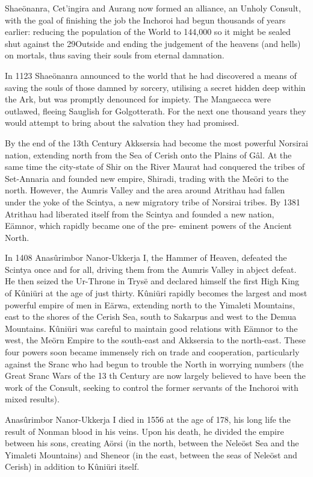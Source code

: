 \documentclass[]{book}
\begin{document}
Shaeönanra, Cet'ingira and Aurang now formed an alliance, an Unholy Consult, with
the goal of finishing the job the Inchoroi had begun thousands of years earlier:
reducing the population of the World to 144,000 so it might be sealed shut against the
29Outside and ending the judgement of the heavens (and hells) on mortals, thus saving
their souls from eternal damnation.

In 1123 Shaeönanra announced to the world that he had discovered a means of saving
the souls of those damned by sorcery, utilising a secret hidden deep within the Ark, but
was promptly denounced for impiety. The Mangaecca were outlawed, fleeing Sauglish
for Golgotterath. For the next one thousand years they would attempt to bring about
the salvation they had promised.

By the end of the 13th Century Akksersia had become the most powerful Norsirai
nation, extending north from the Sea of Cerish onto the Plains of Gâl. At the same
time the city-state of Shir on the River Maurat had conquered the tribes of Set-Annaria
and founded new empire, Shiradi, trading with the Meöri to the north. However, the
Aumris Valley and the area around Atrithau had fallen under the yoke of the Scintya, a
new migratory tribe of Norsirai tribes. By 1381 Atrithau had liberated itself from the
Scintya and founded a new nation, Eämnor, which rapidly became one of the pre-
eminent powers of the Ancient North.

In 1408 Anasûrimbor Nanor-Ukkerja I, the Hammer of Heaven, defeated the Scintya
once and for all, driving them from the Aumris Valley in abject defeat. He then seized
the Ur-Throne in Trysë and declared himself the first High King of Kûniüri at the age
of just thirty. Kûniüri rapidly becomes the largest and most powerful empire of men in
Eärwa, extending north to the Yimaleti Mountains, east to the shores of the Cerish Sea,
south to Sakarpus and west to the Demua Mountains. Kûniüri was careful to maintain
good relations with Eämnor to the west, the Meörn Empire to the south-east and
Akksersia to the north-east. These four powers soon became immensely rich on trade
and cooperation, particularly against the Sranc who had begun to trouble the North in
worrying numbers (the Great Sranc Wars of the 13 th Century are now largely believed
to have been the work of the Consult, seeking to control the former servants of the
Inchoroi with mixed results).

Anasûrimbor Nanor-Ukkerja I died in 1556 at the age of 178, his long life the result of
Nonman blood in his veins. Upon his death, he divided the empire between his sons,
creating Aörsi (in the north, between the Neleöst Sea and the Yimaleti Mountains) and
Sheneor (in the east, between the seas of Neleöst and Cerish) in addition to Kûniüri
itself.
\end{document}
